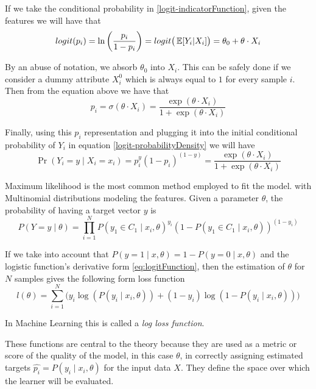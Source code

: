 If we take the conditional probability in \cref{logit-indicatorFunction}, given the features we will have that
\begin{equation}
logit(p_i)= \ln \left(\frac{p_i}{1-p_i} \right) = logit\big( \operatorname{\mathbb{E}}[Y_i| X_i] \big) = \theta_0 + \theta \cdot X_i
\end{equation}

By an abuse of notation, we absorb $\theta_0$ into $X_i$.
This can be safely done if we consider a dummy attribute $X_i^0$ which is always equal to $1$ for every sample $i$.
Then from the equation above we have that
\begin{equation}
p_i = \sigma(\theta \cdot X_i) = \frac{\exp(\theta \cdot X_i) }{1 + \exp(\theta \cdot X_i)}
\end{equation}

Finally, using this $p_i$ representation and plugging it into the initial conditional probability of $Y_i$ in equation \cref{logit-probabilityDensity} we will have
\begin{equation}
 \Pr(Y_i=y \mid X_i = x_i) = p_i^{y} {(1-p_i)}^{(1-y)} = \frac{\exp(\theta \cdot X_i) }{1 + \exp(\theta \cdot X_i)}
 \end{equation}


Maximum likelihood is the most common method employed to fit the model.
with Multinomial distributions modeling the features.
Given a parameter $\theta$, the probability of having a target vector $y$ is
\begin{equation}
P(Y =y \mid \theta ) = \prod_{i=1}^N {P(y_1 \in C_1 \mid x_i, \theta)}^{y_i} {(1 - P(y_1 \in C_1 \mid x_i, \theta) )}^{(1-y_i)}
\end{equation}

If we take into account that $P(y=1 \mid x,\theta) = 1 - P(y=0 \mid x,\theta)$ and the logistic function's derivative form \cref{eq:logitFunction}, then the estimation of $\theta$ for $N$ samples gives the following form
loss function
\begin{equation}
l(\theta) = \sum_{i=1}^N \big(y_i \log(P(y_i \mid x_i,\theta)) + (1-y_i)\log(1 - P(y_i \mid x_i,\theta) ) \big)
\label{eq:logLossFunction}
\end{equation}

In Machine Learning this is called a \emph{log loss function}.

These functions are central to the theory because they are used as a metric or score of the quality of the model, in this case $\theta$, in correctly assigning estimated targets $ {\hat{p_i}} = P(y_i \mid x_i,\theta)$ for the input data $X$.
They define the space over which the learner will be evaluated.

